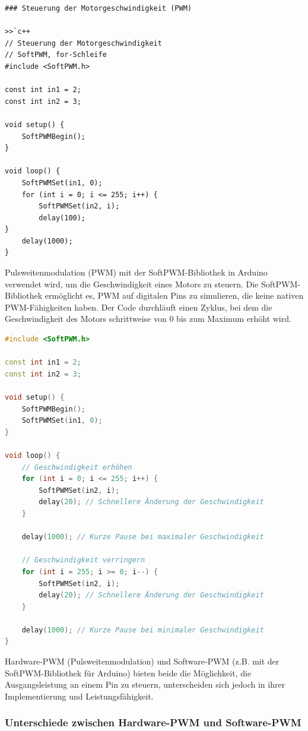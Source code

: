 \documentclass{vorlage-design-main}
\begin{document}
\begin{lstlisting}
### Steuerung der Motorgeschwindigkeit (PWM)

>>`c++
// Steuerung der Motorgeschwindigkeit
// SoftPWM, for-Schleife
#include <SoftPWM.h>

const int in1 = 2;
const int in2 = 3;

void setup() {
    SoftPWMBegin();
}

void loop() {
    SoftPWMSet(in1, 0);
    for (int i = 0; i <= 255; i++) {
        SoftPWMSet(in2, i);
        delay(100);
}
    delay(1000);
}
\end{lstlisting}

Pulsweitenmodulation (PWM) mit der SoftPWM-Bibliothek in Arduino
verwendet wird, um die Geschwindigkeit eines Motors zu steuern. Die
SoftPWM-Bibliothek ermöglicht es, PWM auf digitalen Pins zu simulieren,
die keine nativen PWM-Fähigkeiten haben. Der Code durchläuft einen
Zyklus, bei dem die Geschwindigkeit des Motors schrittweise von 0 bis
zum Maximum erhöht wird.

\begin{lstlisting}[language={C++}]
#include <SoftPWM.h>

const int in1 = 2;
const int in2 = 3;

void setup() {
    SoftPWMBegin();
    SoftPWMSet(in1, 0);
}

void loop() {
    // Geschwindigkeit erhöhen
    for (int i = 0; i <= 255; i++) {
        SoftPWMSet(in2, i);
        delay(20); // Schnellere Änderung der Geschwindigkeit
    }
    
    delay(1000); // Kurze Pause bei maximaler Geschwindigkeit

    // Geschwindigkeit verringern
    for (int i = 255; i >= 0; i--) {
        SoftPWMSet(in2, i);
        delay(20); // Schnellere Änderung der Geschwindigkeit
    }

    delay(1000); // Kurze Pause bei minimaler Geschwindigkeit
}
\end{lstlisting}

Hardware-PWM (Pulsweitenmodulation) und Software-PWM (z.B. mit der
SoftPWM-Bibliothek für Arduino) bieten beide die Möglichkeit, die
Ausgangsleistung an einem Pin zu steuern, unterscheiden sich jedoch in
ihrer Implementierung und Leistungsfähigkeit.

\hypertarget{unterschiede-zwischen-hardware-pwm-und-software-pwm}{%
\subsubsection{Unterschiede zwischen Hardware-PWM und
Software-PWM}\label{unterschiede-zwischen-hardware-pwm-und-software-pwm}}
\end{document}
